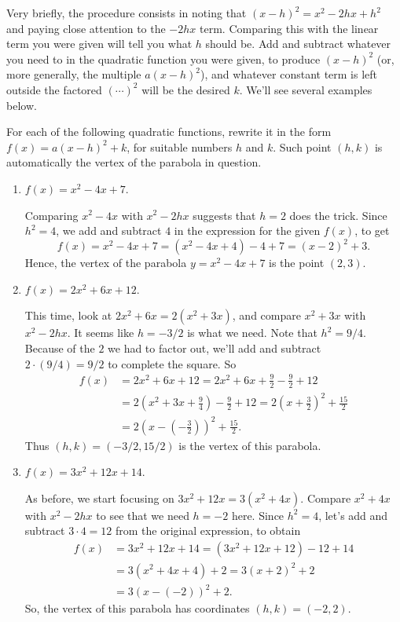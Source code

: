 \documentclass[handout, noauthor, nooutcomes]{ximera}
\begin{document}
Very briefly, the procedure consists in noting that $(x-h)^2 = x^2-2hx+h^2$ and paying close attention to the $-2hx$ term. Comparing this with the linear term you were given will tell you what $h$ should be. Add and subtract whatever you need to in the quadratic function you were given, to produce $(x-h)^2$ (or, more generally, the multiple $a(x-h)^2$), and whatever constant term is left outside the factored $(\cdots)^2$ will be the desired $k$. We'll see several examples below.

\begin{example}
  For each of the following quadratic functions, rewrite it in the form $f(x) = a(x-h)^2+k$, for suitable numbers $h$ and $k$. Such point $(h,k)$ is automatically the vertex of the parabola in question.
  \begin{enumerate}[label=\alph*.]
  \item $f(x) = x^2-4x+7$. \\[.5em]
    \begin{explanation}
      Comparing $x^2-4x$ with $x^2-2hx$ suggests that $h=2$ does the trick. Since $h^2=4$, we add and subtract $4$ in the expression for the given $f(x)$, to get $$  f(x) = x^2-4x+7 =(x^2-4x+4)-4+7 = (x-2)^2+3.   $$Hence, the vertex of the parabola $y=x^2-4x+7$ is the point $(2,3)$.
    \end{explanation}
  \item $f(x) = 2x^2 + 6x+12$. \\[.5em]
    \begin{explanation}
      This time, look at $2x^2+6x = 2(x^2+3x)$, and compare $x^2+3x$ with $x^2-2hx$. It seems like $h=-3/2$ is what we need. Note that $h^2 = 9/4$. Because of the $2$ we had to factor out, we'll add and subtract $2 \cdot (9/4) = 9/2$ to complete the square. So \begin{align*}f(x) &= 2x^2+6x+12 = 2x^2+6x + \frac{9}{2} - \frac{9}{2} + 12 \\ &= 2\left(x^2+3x+\frac{9}{4}\right) -\frac{9}{2} + 12 = 2\left(x+\frac{3}{2}\right)^2 + \frac{15}{2}\\ &=  2\left(x-\left(-\frac{3}{2}\right)\right)^2 + \frac{15}{2}.\end{align*}Thus $(h,k) = (-3/2, 15/2)$ is the vertex of this parabola.
    \end{explanation}
  \item $f(x) = 3x^2 + 12x + 14$. \\[.5em]
    \begin{explanation}
      As before, we start focusing on $3x^2+12x = 3(x^2+4x)$. Compare $x^2+4x$ with $x^2-2hx$ to see that we need $h = -2$ here. Since $h^2 = 4$, let's add and subtract $3 \cdot 4 = 12$ from the original expression, to obtain
      \begin{align*}
        f(x) &= 3x^2+12x+14 = (3x^2+12x+12)-12+14 \\ &= 3(x^2+4x+4) + 2 = 3(x+2)^2+2 \\ &= 3(x-(-2))^2+2.
      \end{align*}
So, the vertex of this parabola has coordinates $(h,k) = (-2,2)$.
    \end{explanation}
  \end{enumerate}
\end{example}
\end{document}
